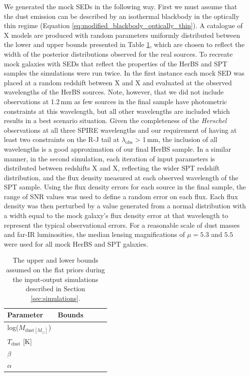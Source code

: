 We generated the mock SEDs in the following way. First we must assume that the dust emission can be described by an isothermal blackbody in the optically thin regime (Equation \ref{eq:modified_blackbody_optically_thin}). A catalogue of {\color{red} X} models are produced with random parameters uniformly distributed between the lower and upper bounds presented in Table \ref{tab:simulation_inputs}, which are chosen to reflect the width of the posterior distributions observed for the real sources. To recreate mock galaxies with SEDs that reflect the properties of the HerBS and SPT samples the simulations were run twice. In the first instance each mock SED was placed at a random redshift between {\color{red} X} and {\color{red} X} and evaluated at the observed wavelengths of the HerBS sources. Note, however, that we did not include observations at 1.2\,mm as few sources in the final sample have photometric constraints at this wavelength, but all other wavelengths are included which results in a best scenario situation. Given the completeness of the \textit{Herschel} observations at all three SPIRE wavelengths and our requirement of having at least two constraints on the R-J tail at $\lambda_{\textrm{obs}}$ > 1\,mm, the inclusion of all wavelengths is a good approximation of our final HerBS sample. In a similar manner, in the second simulation, each iteration of input parameters is distributed between redshifts {\color{red} X} and {\color{red} X}, reflecting the wider SPT redshift distribution, and the flux density measured at each observed wavelength of the SPT sample. Using the flux density errors for each source in the final sample, the range of SNR values was used to define a random error on each flux. Each flux density was then perturbed by a value generated from a normal distribution with a width equal to the mock galaxy's flux density error at that wavelength to represent the typical observational errors. For a reasonable scale of dust masses and far-IR luminosities, the median lensing magnifications of $\mu = 5.3$ and $5.5$ were used for all mock HerBS and SPT galaxies.

\begin{table}
    \centering
    \begin{tabular}{|p{3cm}|p{3cm}|p{3cm}|p{3cm}|p{3cm}|}
        \hline
        Parameter & Bounds \\
        \hline
        \hline
        log($M_{\textrm{dust} [M_\odot]}$) & \\
		$T_{\textrm{dust}}$ [K] &  \\
		$\beta$  &  \\
		$\alpha$  &  \\
        \hline
    \end{tabular}
    \caption{The upper and lower bounds assumed on the flat priors during the input-output simulations described in Section \ref{sec:simulations}.}
    \label{tab:simulation_inputs}
\end{table}

